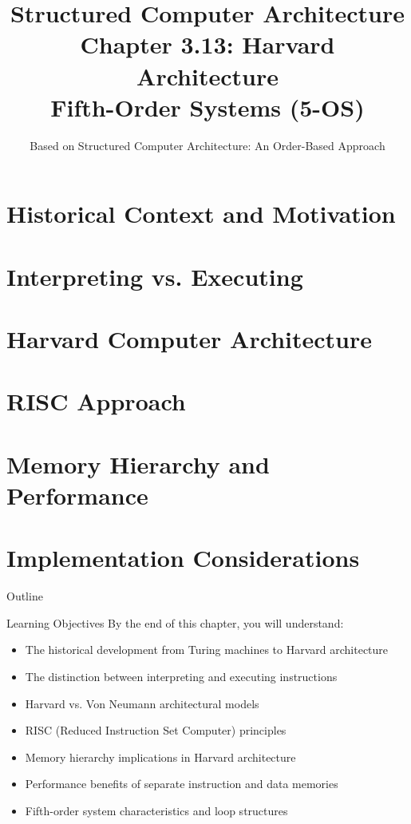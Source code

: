 \documentclass[aspectratio=169]{beamer}
\title[Chapter 3.13: Harvard Architecture]{Structured Computer Architecture\\Chapter 3.13: Harvard Architecture\\Fifth-Order Systems (5-OS)}
\author{Based on Structured Computer Architecture: An Order-Based Approach}
\date{}
\begin{document}
\begin{frame}
\titlepage
\end{frame}

\setcounter{section}{0}

\section{Historical Context and Motivation}
\section{Interpreting vs. Executing}
\section{Harvard Computer Architecture}
\section{RISC Approach}
\section{Memory Hierarchy and Performance}
\section{Implementation Considerations}

\begin{frame}{Outline}
\tableofcontents
\end{frame}

\begin{frame}{Learning Objectives}
By the end of this chapter, you will understand:
\begin{itemize}
\item The historical development from Turing machines to Harvard architecture
\item The distinction between interpreting and executing instructions
\item Harvard vs. Von Neumann architectural models
\item RISC (Reduced Instruction Set Computer) principles
\item Memory hierarchy implications in Harvard architecture
\item Performance benefits of separate instruction and data memories
\item Fifth-order system characteristics and loop structures
\end{itemize}
\end{frame}
\end{document}
